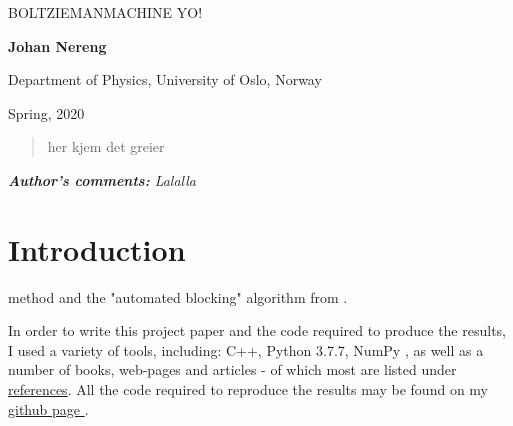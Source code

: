 \documentclass[%
oneside,                 %
final,                   %
10pt]{article}
\begin{document}

\newcommand{\exercisesection}[1]{\subsection*{#1}}






\thispagestyle{empty}

\begin{center}
{\LARGE\bf
\begin{spacing}{1.25}
BOLTZIEMANMACHINE YO!
\end{spacing}
}
\end{center}


\begin{center}
{\bf Johan Nereng}
\end{center}

    \begin{center}
\centerline{{\small Department of Physics, University of Oslo, Norway}}
\end{center}
    

\begin{center}
Spring, 2020
\end{center}

\vspace{3cm}
\vspace{3cm}
\begin{abstract}
her kjem det greier
\end{abstract}


\newpage


\textit{\textbf{Author's comments:} Lalalla}
\newpage


\section{Introduction}
 method and the "automated blocking" algorithm from \citep{Jonsson}.

 
In order to write this project paper and the code required to produce the results, I used a variety of tools, including: C++, Python 3.7.7, NumPy \cite{numpy}, as well as a number of books, web-pages and articles - of which most are listed under 
 \hyperref[refer]{references}. All the code required to reproduce the results may be found on my \href{https://github.com/johanere/FYS4411}{github page }.  
 
\end{document}
